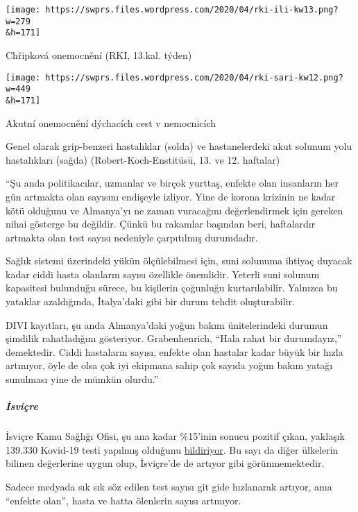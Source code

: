 \href{https://swprs.files.wordpress.com/2020/04/rki-ili-kw13.png}{}

\texttt{[image: https://swprs.files.wordpress.com/2020/04/rki-ili-kw13.png?w=279\\\&h=171]}

Chřipková onemocnění (RKI, 13.kal. týden)

\href{https://swprs.files.wordpress.com/2020/04/rki-sari-kw12.png}{}

\texttt{[image: https://swprs.files.wordpress.com/2020/04/rki-sari-kw12.png?w=449\\\&h=171]}

Akutní onemocnění dýchacích cest v nemocnicích

Genel olarak grip-benzeri hastalıklar (solda) ve hastanelerdeki akut
solunum yolu hastalıkları (sağda) (Robert-Koch-Enstitüsü, 13. ve 12.
haftalar)

``Şu anda politikacılar, uzmanlar ve birçok yurttaş, enfekte olan
insanların her gün artmakta olan sayısını endişeyle izliyor. Yine de
korona krizinin ne kadar kötü olduğunu ve Almanya'yı ne zaman vuracağını
değerlendirmek için gereken nihai gösterge bu değildir. Çünkü bu
rakamlar başından beri, haftalardır artmakta olan test sayısı nedeniyle
çarpıtılmış durumdadır.

Sağlık sistemi üzerindeki yükün ölçülebilmesi için, suni solunuma
ihtiyaç duyacak kadar ciddi hasta olanların sayısı özellikle önemlidir.
Yeterli suni solunum kapasitesi bulunduğu sürece, bu kişilerin çoğunluğu
kurtarılabilir. Yalnızca bu yataklar azaldığında, İtalya'daki gibi bir
durum tehdit oluşturabilir.

DIVI kayıtları, şu anda Almanya'daki yoğun bakım ünitelerindeki durumun
şimdilik rahatladığını gösteriyor. Grabenhenrich, ``Hala rahat bir
durumdayız,'' demektedir. Ciddi hastaların sayısı, enfekte olan hastalar
kadar büyük bir hızla artmıyor, öyle de olsa çok iyi ekipmana sahip çok
sayıda yoğun bakım yatağı sunulması yine de mümkün olurdu.''

\hypertarget{isviuxe7re-1}{%
\subparagraph{\texorpdfstring{\textbf{İsviçre}}{İsviçre}}\label{isviuxe7re-1}}

İsviçre Kamu Sağlığı Ofisi, şu ana kadar \%15'inin sonucu pozitif çıkan,
yaklaşık 139.330 Kovid-19 testi yapılmış olduğunu
\href{https://www.bag.admin.ch/bag/de/home/krankheiten/ausbrueche-epidemien-pandemien/aktuelle-ausbrueche-epidemien/novel-cov/situation-schweiz-und-international.html}{bildiriyor}.
Bu sayı da diğer ülkelerin bilinen değerlerine uygun olup, İsviçre'de de
artıyor gibi görünmemektedir.

Sadece medyada sık sık söz edilen test sayısı git gide hızlanarak
artıyor, ama ``enfekte olan'', hasta ve hatta ölenlerin sayısı artmıyor.

